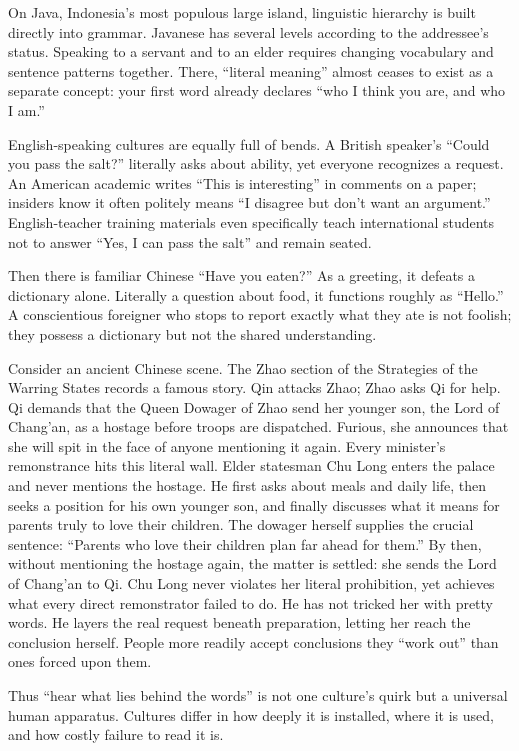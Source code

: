 On Java, Indonesia's most populous large island, linguistic hierarchy is built directly into grammar. Javanese has several levels according to the addressee's status. Speaking to a servant and to an elder requires changing vocabulary and sentence patterns together. There, ``literal meaning'' almost ceases to exist as a separate concept: your first word already declares ``who I think you are, and who I am.''

English-speaking cultures are equally full of bends. A British speaker's ``Could you pass the salt?'' literally asks about ability, yet everyone recognizes a request. An American academic writes ``This is interesting'' in comments on a paper; insiders know it often politely means ``I disagree but don't want an argument.'' English-teacher training materials even specifically teach international students not to answer ``Yes, I can pass the salt'' and remain seated.

Then there is familiar Chinese ``Have you eaten?'' As a greeting, it defeats a dictionary alone. Literally a question about food, it functions roughly as ``Hello.'' A conscientious foreigner who stops to report exactly what they ate is not foolish; they possess a dictionary but not the shared understanding.

Consider an ancient Chinese scene. The Zhao section of the Strategies of the Warring States records a famous story. Qin attacks Zhao; Zhao asks Qi for help. Qi demands that the Queen Dowager of Zhao send her younger son, the Lord of Chang'an, as a hostage before troops are dispatched. Furious, she announces that she will spit in the face of anyone mentioning it again. Every minister's remonstrance hits this literal wall. Elder statesman Chu Long enters the palace and never mentions the hostage. He first asks about meals and daily life, then seeks a position for his own younger son, and finally discusses what it means for parents truly to love their children. The dowager herself supplies the crucial sentence: ``Parents who love their children plan far ahead for them.'' By then, without mentioning the hostage again, the matter is settled: she sends the Lord of Chang'an to Qi. Chu Long never violates her literal prohibition, yet achieves what every direct remonstrator failed to do. He has not tricked her with pretty words. He layers the real request beneath preparation, letting her reach the conclusion herself. People more readily accept conclusions they ``work out'' than ones forced upon them.

Thus ``hear what lies behind the words'' is not one culture's quirk but a universal human apparatus. Cultures differ in how deeply it is installed, where it is used, and how costly failure to read it is.

